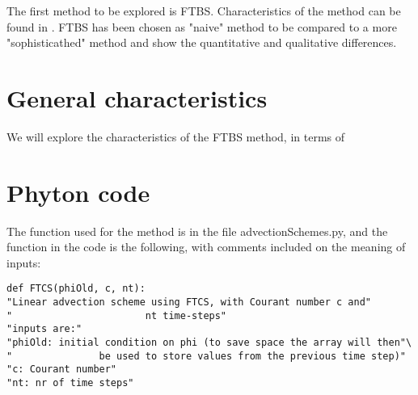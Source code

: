 



The first method to be explored is FTBS. Characteristics of the method can be found in \cite{mpebook}.
FTBS has been chosen as "naive" method to be compared to a more "sophisticathed" method and show the quantitative and qualitative differences.

\section{General characteristics}
We will explore the characteristics of the FTBS method, in terms of 


\section{Phyton code}
The function used for the method is in the file advectionSchemes.py, and the function in the code is the following, with comments included on the meaning of inputs:
\begin{lstlisting}
def FTCS(phiOld, c, nt):    
"Linear advection scheme using FTCS, with Courant number c and"
"                       nt time-steps"
"inputs are:"
"phiOld: initial condition on phi (to save space the array will then"\
"               be used to store values from the previous time step)"
"c: Courant number"
"nt: nr of time steps"
\end{lstlisting}



